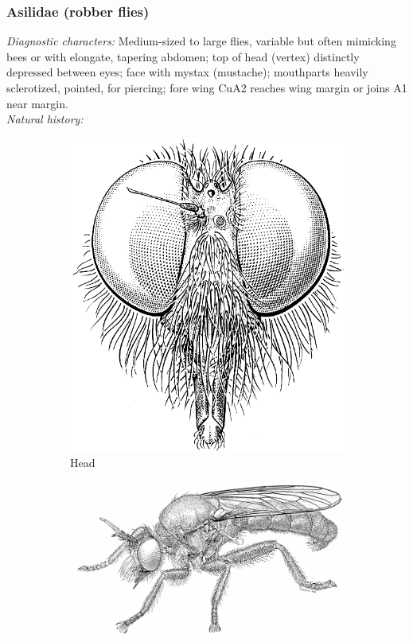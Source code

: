 \documentclass[letterpaper, 11pt]{article}
\begin{document}
\subsubsection{Asilidae (robber flies)}
\noindent{}\textit{Diagnostic characters:} Medium-sized to large flies, variable but often mimicking bees or with elongate, tapering abdomen; top of head (vertex) distinctly depressed between eyes; face with mystax (mustache); mouthparts heavily sclerotized, pointed, for piercing; fore wing CuA2 reaches wing margin or joins A1 near margin.\\

\noindent{}\textit{Natural history:} \\

\begin{figure}[ht!]
    \centering
    \begin{subfigure}[ht!]{0.25\textwidth}
        \includegraphics[width=\textwidth]{AsilidHead}
        \caption{Head \citep[][Fig. 42.35]{mcalpine1981manual}}
        \label{fig:asilid2}
    \end{subfigure}
    \qquad 
    \begin{subfigure}[ht!]{0.45\textwidth}
        \includegraphics[width=\textwidth]{AsilidHabitus}

\end{subfigure}
\end{figure}
\end{document}
